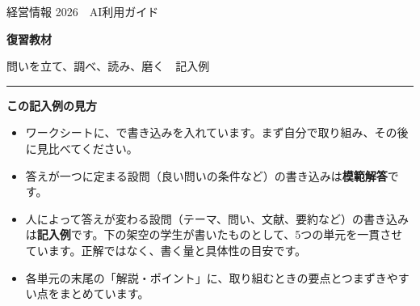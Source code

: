 \thispagestyle{cover}
\vspace*{12mm}
{\sffamily\color{pone}\large 経営情報 2026　AI利用ガイド}\par
\vspace{3mm}
{\sffamily\bfseries\fontsize{30pt}{38pt}\selectfont 復習教材}\par
\vspace{2mm}
{\sffamily\fontsize{20pt}{26pt}\selectfont 問いを立て、調べ、読み、磨く　\textcolor{ans}{記入例}}\par
\vspace{3mm}
{\color{inktwo}\rule{\linewidth}{0.6pt}}\par
\vspace{6mm}

\begin{tcolorbox}[enhanced,colback=papertwo,colframe=papertwo,boxrule=0pt,arc=1.5mm,
    left=4mm,right=4mm,top=3mm,bottom=3mm,fontupper=\small]
{\sffamily\bfseries この記入例の見方}\par\vspace{1mm}
\begin{itemize}[label=・]
  \item ワークシートに、で書き込みを入れています。まず自分で取り組み、その後に見比べてください。
  \item 答えが一つに定まる設問（良い問いの条件など）の書き込みは\textbf{模範解答}です。
  \item 人によって答えが変わる設問（テーマ、問い、文献、要約など）の書き込みは\textbf{記入例}です。下の架空の学生が書いたものとして、5つの単元を一貫させています。正解ではなく、書く量と具体性の目安です。
  \item 各単元の末尾の「\textcolor{ans}{解説・ポイント}」に、取り組むときの要点とつまずきやすい点をまとめています。
\end{itemize}
\end{tcolorbox}

